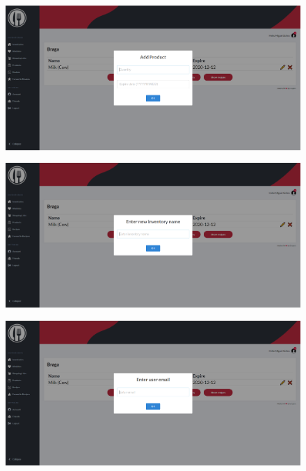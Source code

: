\documentclass[a4paper]{report}
\begin{document}
    \begin{figure}[H]
        \centering
            \includegraphics[width=\textwidth]{images/produto_final/inserir_produto_quantidade.png}
    \end{figure}

    \begin{figure}[H]
        \centering
            \includegraphics[width=\textwidth]{images/produto_final/alterar_nome_iventario.png}
    \end{figure}

    \begin{figure}[H]
        \centering
            \includegraphics[width=\textwidth]{images/produto_final/partilhar_com_outro_utilizador.png}
    \end{figure}
\end{document}

